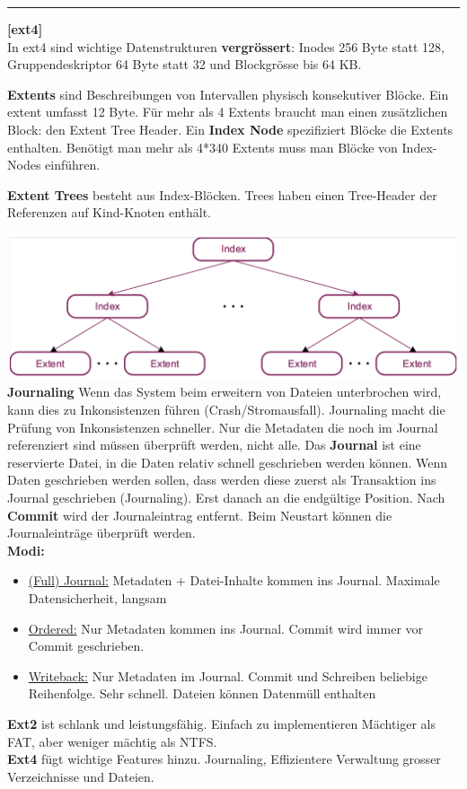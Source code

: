 \documentclass[8pt]{extarticle}
\let\oldtextbf\textbf
\renewcommand{\textbf}{\tiny\oldtextbf}
\begin{document}
\begin{multicols*}{5}
	\vspace{5pt}
	\rule{\linewidth}{0.4pt}
	\textbf{[ext4]}\\
	
	In ext4 sind wichtige Datenstrukturen \textbf{vergrössert}: Inodes 256 Byte statt 128, Gruppendeskriptor 64 Byte statt 32 und Blockgrösse bis 64 KB.
	
	\textbf{Extents} sind Beschreibungen von Intervallen physisch konsekutiver Blöcke. Ein extent umfasst 12 Byte. Für mehr als 4 Extents braucht man einen zusätzlichen Block: den Extent Tree Header.
	Ein \textbf{Index Node} spezifiziert Blöcke die Extents enthalten. Benötigt man mehr als 4*340 Extents muss man Blöcke von Index-Nodes einführen.
	
	\textbf{Extent Trees} besteht aus Index-Blöcken. Trees haben einen Tree-Header der Referenzen auf Kind-Knoten enthält.
	
	\includegraphics[scale=0.22]{Extent-Trees.png} %
	\vspace{5pt}\\
	\textbf{Journaling} Wenn das System beim erweitern von Dateien unterbrochen wird, kann dies zu Inkonsistenzen führen (Crash/Stromausfall). Journaling macht die Prüfung von Inkonsistenzen schneller. Nur die Metadaten die noch im Journal referenziert sind müssen überprüft werden, nicht alle.
	Das \textbf{Journal} ist eine reservierte Datei, in die Daten relativ schnell geschrieben werden können. Wenn Daten geschrieben werden sollen, dass werden diese zuerst als Transaktion ins Journal geschrieben (Journaling). Erst danach an die endgültige Position. Nach \textbf{Commit} wird der Journaleintrag entfernt. Beim Neustart können die Journaleinträge überprüft werden.\\
	\textbf{Modi:}
	\begin{itemize} [noitemsep, topsep=0pt, leftmargin=*]
		\item \underline{(Full) Journal:} Metadaten + Datei-Inhalte kommen ins Journal. Maximale Datensicherheit, langsam
		\item \underline{Ordered:} Nur Metadaten kommen ins Journal. Commit wird immer vor Commit geschrieben.
		\item \underline{Writeback:} Nur Metadaten im Journal. Commit und Schreiben beliebige Reihenfolge. Sehr schnell. Dateien können Datenmüll enthalten
	\end{itemize}
	\textbf{Ext2} ist schlank und leistungsfähig. Einfach zu implementieren Mächtiger als FAT, aber weniger mächtig als NTFS.\\
	\textbf{Ext4} fügt wichtige Features hinzu. Journaling, Effizientere Verwaltung grosser Verzeichnisse und Dateien.
	

\end{multicols*}
\end{document}
